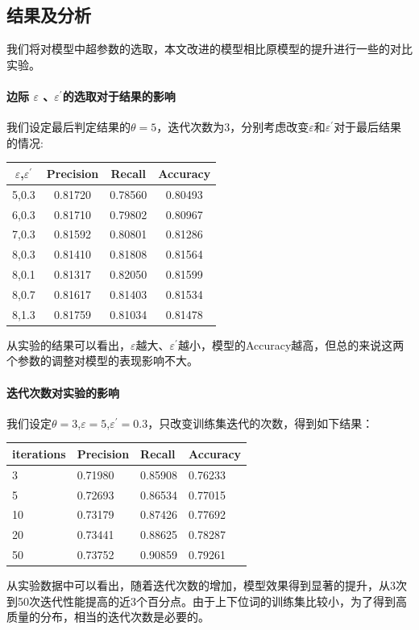 \documentclass[a4paper,13pt]{article}
\begin{document}
\begin{spacing}{1.5}
\subsection{结果及分析}

我们将对模型中超参数的选取，本文改进的模型相比原模型的提升进行一些的对比实验。

\paragraph {边际 $\varepsilon$ 、$\varepsilon^{'}$的选取对于结果的影响}

我们设定最后判定结果的$\theta=5$，迭代次数为3，分别考虑改变$\varepsilon$和$\varepsilon^{'}$对于最后结果的情况:
\begin{center}
\begin{tabular}{| c | c | c | c |}
	\hline
	\bf $\varepsilon$,$\varepsilon^{'}$ & \bf Precision & \bf Recall & \bf Accuracy \\
	\hline
	5,0.3 & 0.81720 & 0.78560 & 0.80493 \\
	\hline
	6,0.3 & 0.81710 & 0.79802 & 0.80967 \\
	\hline
	7,0.3 & 0.81592 & 0.80801 & 0.81286 \\
	\hline
	8,0.3 & 0.81410 & 0.81808 & 0.81564 \\
	\hline
	8,0.1 & 0.81317 & 0.82050 & 0.81599 \\
	\hline
	8,0.7 & 0.81617 & 0.81403 & 0.81534 \\
	\hline
	8,1.3 & 0.81759 & 0.81034 & 0.81478 \\
	\hline
\end{tabular}
\end{center}
从实验的结果可以看出，$\varepsilon$越大、$\varepsilon^{'}$越小，模型的Accuracy越高，但总的来说这两个参数的调整对模型的表现影响不大。

\paragraph{迭代次数对实验的影响}
 
我们设定$\theta=3$,$\varepsilon=5$,$\varepsilon^{'}=0.3$，只改变训练集迭代的次数，得到如下结果：
\begin{center}
\begin{tabular}{| l | l | l | l |}
	\hline
	\bf iterations & \bf Precision & \bf Recall & \bf Accuracy \\
	\hline
	3 & 0.71980 & 0.85908 & 0.76233 \\
	\hline
	5 & 0.72693 & 0.86534 & 0.77015 \\
	\hline
	10 & 0.73179 & 0.87426 & 0.77692 \\
	\hline
	20 & 0.73441 & 0.88625 & 0.78287 \\
	\hline
	50 & 0.73752 & 0.90859 & 0.79261 \\
	\hline
\end{tabular}
\end{center}
从实验数据中可以看出，随着迭代次数的增加，模型效果得到显著的提升，从3次到50次迭代性能提高的近3个百分点。由于上下位词的训练集比较小，为了得到高质量的分布，相当的迭代次数是必要的。


\end{spacing}
\end{document}
